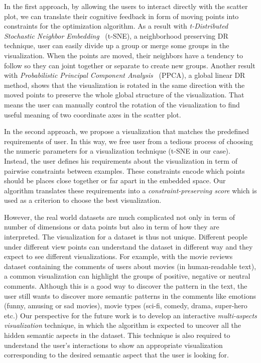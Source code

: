In the first approach, by allowing the users to interact directly with the scatter plot, we can translate their cognitive feedback in form of moving points into constraints for the optimization algorithm.
As a result with \emph{t-Distributed Stochastic Neighbor Embedding}~\cite{maaten2008tsne} (t-SNE), a neighborhood preserving DR technique, user can easily divide up a group or merge some groups in the visualization.
When the points are moved, their neighbors have a tendency to follow so they can joint together or separate to create new groups.
Another result with \emph{Probabilistic Principal Component Analysis}~\cite{tipping1999ppca} (PPCA), a global linear DR method, shows that the visualization is rotated in the same direction with the moved points to preserve the whole global structure of the visualization. That means the user can manually control the rotation of the visualization to find useful meaning of two coordinate axes in the scatter plot.

In the second approach, we propose a visualization that matches the predefined requirements of user.
In this way, we free user from a tedious process of choosing the numeric parameters for a visualization technique (t-SNE in our case).
Instead, the user defines his requirements about the visualization in term of pairwise constraints between examples.
These constraints encode which points should be places close together or far apart in the embedded space.
Our algorithm translates these requirements into a \emph{constraint-preserving score} which is used as a criterion to choose the best visualization.

However, the real world datasets are much complicated not only in term of number of dimensions or data points but also in term of how they are interpreted.
The visualization for a dataset is thus not unique. Different people under different view points can understand the dataset in different way and they expect to see different visualizations.
For example, with the movie reviews dataset containing the comments of users about movies (in human-readable text), a common visualization can highlight the groups of positive, negative or neutral comments.
Although this is a good way to discover the pattern in the text, the user still wants to discover more semantic patterns in the comments like emotions (funny, amusing or sad movies), movie types (sci-fi, comedy, drama, super-hero etc.)
Our perspective for the future work is to develop an interactive \emph{multi-aspects visualization} technique, in which the algorithm is expected to uncover all the hidden semantic aspects in the dataset.
This technique is also required to understand the user's interactions to show an appropriate visualization corresponding to the desired semantic aspect that the user is looking for.
